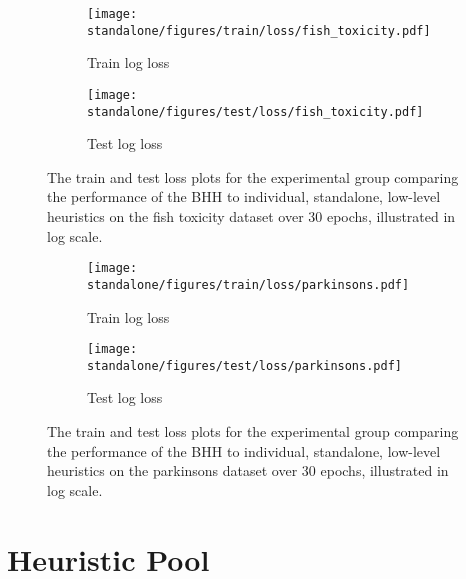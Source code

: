 \begin{figure}[htpb]
	\begin{subfigure}{0.5\textwidth}
		\centering
		\texttt{[image: standalone/figures/train/loss/fish\_toxicity.pdf]}
		\caption{Train log loss}
		\label{fig:results:standalone:figures:loss:train:fish_toxicity}
	\end{subfigure}
	\begin{subfigure}{0.5\textwidth}
		\centering
		\texttt{[image: standalone/figures/test/loss/fish\_toxicity.pdf]}
		\caption{Test log loss}
		\label{fig:results:standalone:figures:loss:test:fish_toxicity}
	\end{subfigure}
	\par\bigskip
	\caption{The train and test loss plots for the experimental group comparing the performance of the \acs{BHH} to individual, standalone, low-level heuristics on the fish toxicity dataset over 30 epochs, illustrated in log scale.}
	\label{fig:results:standalone:figures:fish_toxicity}
\end{figure}


\begin{figure}[htpb]
	\begin{subfigure}{0.5\textwidth}
		\centering
		\texttt{[image: standalone/figures/train/loss/parkinsons.pdf]}
		\caption{Train log loss}
		\label{fig:results:standalone:figures:loss:train:parkinsons}
	\end{subfigure}
	\begin{subfigure}{0.5\textwidth}
		\centering
		\texttt{[image: standalone/figures/test/loss/parkinsons.pdf]}
		\caption{Test log loss}
		\label{fig:results:standalone:figures:loss:test:parkinsons}
	\end{subfigure}
	\par\bigskip
	\caption{The train and test loss plots for the experimental group comparing the performance of the \acs{BHH} to individual, standalone, low-level heuristics on the parkinsons dataset over 30 epochs, illustrated in log scale.}
	\label{fig:results:standalone:figures:parkinsons}
\end{figure}



\section{Heuristic Pool}\label{sec:results:heuristic_pool}

